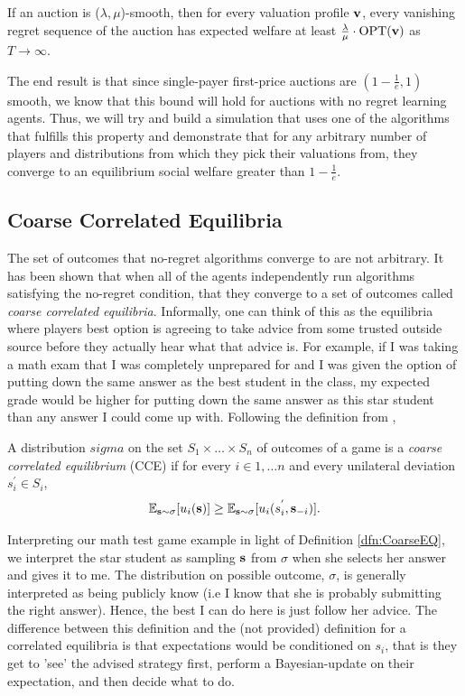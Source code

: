 \documentclass[12pt,twoside]{reedthesis}
\begin{document}
\begin{theorem}
	If an auction is ($\lambda, \mu$)-smooth, then for every valuation profile $\textbf{v}$, every vanishing regret sequence of the auction has expected welfare at least $\frac{\lambda}{\mu} \cdot \text{OPT}(\textbf{v})$ as $T \rightarrow \infty$.  
\end{theorem}

The end result is that since single-payer first-price auctions are $(1-\frac{1}{e}, 1)$ smooth, we know that this bound will hold for auctions with no regret learning agents. Thus, we will try and build a simulation that uses one of the algorithms that fulfills this property and demonstrate that for any arbitrary number of players and distributions from which they pick their valuations from, they converge to an equilibrium social welfare greater than $1-\frac{1}{e}$.

\label{sec:No-Regret-Learning}
\subsection{Coarse Correlated Equilibria}
The set of outcomes that no-regret algorithms converge to are not arbitrary. It has been shown that when all of the agents independently run algorithms satisfying the no-regret condition, that they converge to a set of outcomes called {\em coarse correlated equilibria}. Informally, one can think of this as the equilibria where players best option is agreeing to take advice from some trusted outside source before they actually hear what that advice is. For example, if I was taking a math exam that I was completely unprepared for and I was given the option of putting down the same answer as the best student in the class, my expected grade would be higher for putting down the same answer as this star student than any answer I could come up with. Following the definition from \cite{Roughgarden2016},
\begin{dfn}
	A distribution $sigma$ on the set $S_1 \times \ldots \times S_n$ of outcomes of a game is a {\em coarse correlated equilibrium} (CCE) if for every $i \in {1, \ldots n}$ and every unilateral deviation $s_i^{'} \in S_i$,
	$$\mathbb{E}_{\textbf{s} \sim \sigma}[u_i(\textbf{s})] \geq \mathbb{E}_{\textbf{s} \sim \sigma}[u_i(s_i^{'}, \textbf{s}_{-i})].$$
	\label{dfn:CoarseEQ}
\end{dfn}

Interpreting our math test game example in light of Definition \ref{dfn:CoarseEQ}, we interpret the star student as sampling $\textbf{s}$ from $\sigma$ when she selects her answer and gives it to me. The distribution on possible outcome, $\sigma$, is generally interpreted as being publicly know (i.e I know that she is probably submitting the right answer). Hence, the best I can do here is just follow her advice. The difference between this definition and the (not provided) definition for a correlated equilibria is that expectations would be conditioned on $s_i$, that is they get to 'see' the advised strategy first, perform a Bayesian-update on their expectation, and then decide what to do. 
\end{document}
